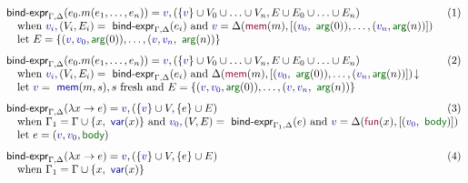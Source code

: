 \documentclass[english,submission]{programming}
\theoremstyle{plain}
\theoremstyle{definition}
\newcommand{\ident}[1]{\textnormal{\textcolor{idclr}{\sffamily #1}}}
\newcommand{\bndclr}[1]{\textcolor{kvdclr}{#1}}
\newcommand{\bnd}[1]{\textnormal{\textcolor{kvdclr}{\sffamily #1}}}
\newcommand{\bknd}[1]{\textnormal{\textcolor{prepclr}{\sffamily #1}}}
\newcommand{\blbl}[1]{\textnormal{\textcolor{numclr}{\sffamily #1}}}
\begin{document}
\begin{figure}[t]
\vspace{-1em}
\begin{equation*}
\hspace{-1.5em}
\begin{array}{ll}
\ident{bind-expr}_{\Gamma, \Delta}(e_0.m(e_1, \ldots, e_n)) = \bndclr{v}, (\{\bndclr{v}\} \cup V_0 \cup \ldots \cup V_n, E \cup E_0 \cup \ldots \cup E_n) &\hspace{-2em}(1)~~\\
\quad \textnormal{when}~\bndclr{v_i}, (V_i, E_i) = \ident{bind-expr}_{\Gamma, \Delta}(e_i)
~\textnormal{and}~\bndclr{v} = \Delta(\bknd{mem}(m),[(\bndclr{v_0}, \blbl{arg}(0)), \ldots, (\bndclr{v_n}, \blbl{arg}(n))])\\
\quad \textnormal{let}~E = \{ (\bndclr{v}, \bndclr{v_0}, \blbl{arg}(0)), \ldots, (\bndclr{v}, \bndclr{v_n}, \blbl{arg}(n))\}
\\[0.75em]
\ident{bind-expr}_{\Gamma, \Delta}(e_0.m(e_1, \ldots, e_n)) = \bndclr{v}, (\{\bndclr{v}\} \cup V_0 \cup \ldots \cup V_n, E \cup E_0 \cup \ldots \cup E_n)&\hspace{-2em}(2)\\
\quad \textnormal{when}~\bndclr{v_i}, (V_i, E_i) = \ident{bind-expr}_{\Gamma, \Delta}(e_i)
~\textnormal{and}~\Delta(\bknd{mem}(m),[(\bndclr{v_0}, \blbl{arg}(0)), \ldots, (\bndclr{v_n}, \blbl{arg}(n))])\!\downarrow\\
\quad \textnormal{let}~\bndclr{v} = \bnd{mem}(m, s), s~\textnormal{fresh}
~\textnormal{and}~E = \{ (\bndclr{v}, \bndclr{v_0}, \blbl{arg}(0)), \ldots, (\bndclr{v},\bndclr{v_n}, \blbl{arg}(n)) \}
\\[0.75em]
\ident{bind-expr}_{\Gamma, \Delta}(\lambda x \rightarrow e) = \bndclr{v}, (\{\bndclr{v}\} \cup V, \{e\} \cup E)&\hspace{-2em}(3)\\
\quad \textnormal{when}~\Gamma_1 = \Gamma \cup \{ x, \bnd{var}(x) \}
~\textnormal{and}~\bndclr{v_0}, (V, E) = \ident{bind-expr}_{\Gamma_1, \Delta}(e)
~\textnormal{and}~\bndclr{v} = \Delta(\bknd{fun}(x),[(\bndclr{v_0}, \blbl{body})])\\
\quad \textnormal{let}~e = (\bndclr{v}, \bndclr{v_0}, \blbl{body})
\\[0.75em]
\ident{bind-expr}_{\Gamma, \Delta}(\lambda x \rightarrow e) = \bndclr{v}, (\{\bndclr{v}\} \cup V, \{e\} \cup E)&\hspace{-2em}(4)\\
\quad \textnormal{when}~\Gamma_1 = \Gamma \cup \{ x, \bnd{var}(x) \}

\end{array}
\end{equation*}
\end{figure}
\end{document}
